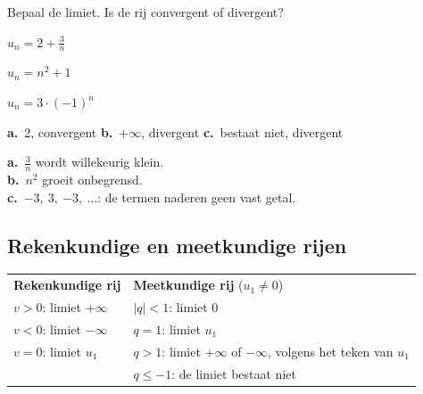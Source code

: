 
\begin{oefeningen}
\begin{oefening}
Bepaal de limiet. Is de rij convergent of divergent?
\begin{reeks}
  \item $u_n = 2 + \tfrac3n$
  \item $u_n = n^2 + 1$
  \item $u_n = 3 \cdot (-1)^n$
\end{reeks}
\begin{solution}
\textbf{a.}~2, convergent \quad \textbf{b.}~$+\infty$, divergent \quad \textbf{c.}~bestaat niet, divergent
\end{solution}
\begin{fullsolution}
\textbf{a.}~$\tfrac3n$ wordt willekeurig klein.\\
\textbf{b.}~$n^2$ groeit onbegrensd.\\
\textbf{c.}~$-3,\ 3,\ {-3},\ \ldots$: de termen naderen geen vast getal.
\end{fullsolution}
\end{oefening}
\end{oefeningen}

\subsection{Rekenkundige en meetkundige rijen}

\begin{theorie}
\begin{tabular}{@{}>{\RaggedRight\arraybackslash}p{6.2cm}>{\RaggedRight\arraybackslash}p{8.4cm}@{}}
\textbf{Rekenkundige rij} & \textbf{Meetkundige rij} ($u_1 \neq 0$) \\[1mm]
$v > 0$: limiet $+\infty$ & $|q| < 1$: limiet 0 \\
$v < 0$: limiet $-\infty$ & $q = 1$: limiet $u_1$ \\
$v = 0$: limiet $u_1$ & $q > 1$: limiet $+\infty$ of $-\infty$, volgens het teken van $u_1$ \\
 & $q \leqslant -1$: de limiet bestaat niet
\end{tabular}
\end{theorie}


